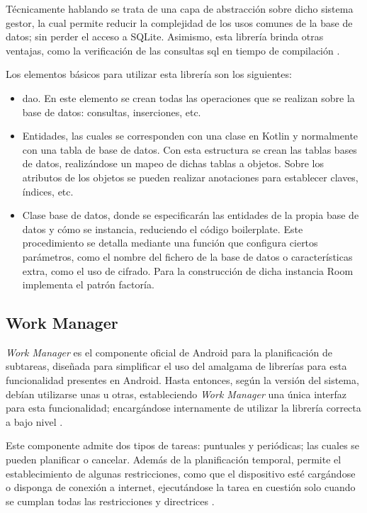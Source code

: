         Técnicamente hablando se trata de una capa de abstracción sobre dicho sistema gestor, la cual permite reducir la complejidad de los usos comunes de la base de datos; sin perder el acceso a SQLite. Asimismo, esta librería brinda otras ventajas, como la verificación de las consultas
        \gls{sql} en tiempo de compilación \cite{android_developers_como_nodate}.

        Los elementos básicos para utilizar esta librería son los siguientes:
        \begin{itemize}
            \item \gls{dao}. En este elemento se crean todas las operaciones que se realizan sobre la base de datos: consultas, inserciones, etc.
            \item Entidades, las cuales se corresponden con una clase en Kotlin y normalmente con una tabla de base de datos. Con esta estructura se crean las tablas bases de datos, realizándose un mapeo de dichas tablas a objetos. Sobre los atributos de los objetos se pueden realizar anotaciones para establecer claves, índices, etc.
            \item Clase base de datos, donde se especificarán las entidades de la propia base de datos y cómo se instancia, reduciendo el código \gls{boilerplate}. Este procedimiento se detalla mediante una función que configura ciertos parámetros, como el nombre del fichero de la base de datos o características extra, como el uso de cifrado. Para la construcción de dicha instancia Room implementa el patrón factoría.
        \end{itemize}
    
    \subsection{Work Manager}
        \textit{Work Manager} es el componente oficial de Android para la planificación de subtareas, diseñada para simplificar el uso del amalgama de librerías para esta
        funcionalidad presentes en Android. Hasta entonces, según la versión del sistema, debían utilizarse unas u otras, estableciendo \textit{Work Manager} una única interfaz para esta funcionalidad; encargándose internamente de utilizar la librería correcta a bajo nivel \cite{android_developers_workmanager_nodate}.
        
        Este componente admite dos tipos de tareas: puntuales y periódicas; las cuales se pueden planificar o cancelar. Además de la planificación temporal, permite el establecimiento de algunas restricciones, como que el dispositivo esté cargándose o disponga de conexión a internet, ejecutándose la tarea en cuestión solo cuando se cumplan todas las restricciones y directrices \cite{android_developers_arquitectura_nodate}.

